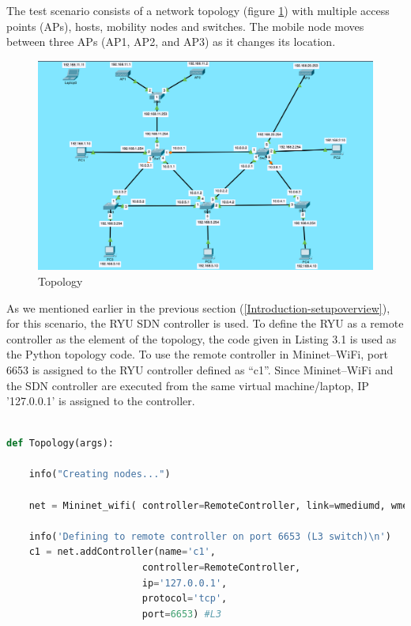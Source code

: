 \documentclass[
  oneside,
  11pt, a4paper,
  footinclude=true,
  headinclude=true,
  cleardoublepage=empty
]{scrbook}
\begin{document}
\par

The test scenario consists of a network topology (figure \ref{Topology}) with multiple access points (APs), hosts, mobility nodes and switches. The mobile node moves between three APs (AP1, AP2, and AP3) as it changes its location.


\begin{figure}[H]
\begin{center}
  \includegraphics[width=1\textwidth]{img/topo.png}
\end{center}
  \caption{Topology}
  \centering  
  \label{Topology}
\end{figure}

As we mentioned earlier in the previous section (\ref{Introduction-setupoverview}), for this scenario, the RYU SDN controller is used. To define the RYU as a remote controller as the element of the topology, 
the code given in Listing 3.1
is used as the Python topology code. To use the remote controller in Mininet–WiFi, port
6653 is assigned to the RYU controller defined as “c1”. Since Mininet–WiFi and the SDN
controller are executed from the same virtual machine/laptop, IP ’127.0.0.1’ is assigned to
the controller. 

\begin{lstlisting}[language=Python, caption=Adding Remote Controller RYU]

def Topology(args):

    info("Creating nodes...")
    
    net = Mininet_wifi( controller=RemoteController, link=wmediumd, wmediumd_mode=interference)
    
    info('Defining to remote controller on port 6653 (L3 switch)\n')
    c1 = net.addController(name='c1',
                        controller=RemoteController,
                        ip='127.0.0.1',
                        protocol='tcp',
                        port=6653) #L3

\end{lstlisting}
\end{document}
